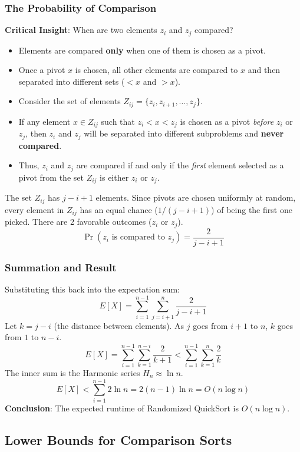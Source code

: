 \documentclass[12pt]{article}
\theoremstyle{blueplain}
\theoremstyle{bluedef}
\theoremstyle{blueremark}
\begin{document}
\subsubsection{The Probability of Comparison}
\textbf{Critical Insight}: When are two elements $z_i$ and $z_j$ compared?
\begin{itemize}
    \item Elements are compared \textbf{only} when one of them is chosen as a pivot.
    \item Once a pivot $x$ is chosen, all other elements are compared to $x$ and then separated into different sets ($<x$ and $>x$).
    \item Consider the set of elements $Z_{ij} = \{z_i, z_{i+1}, \dots, z_j\}$.
    \item If any element $x \in Z_{ij}$ such that $z_i < x < z_j$ is chosen as a pivot \textit{before} $z_i$ or $z_j$, then $z_i$ and $z_j$ will be separated into different subproblems and \textbf{never compared}.
    \item Thus, $z_i$ and $z_j$ are compared if and only if the \textit{first} element selected as a pivot from the set $Z_{ij}$ is either $z_i$ or $z_j$.
\end{itemize}

The set $Z_{ij}$ has $j - i + 1$ elements. Since pivots are chosen uniformly at random, every element in $Z_{ij}$ has an equal chance ($1 / (j-i+1)$) of being the first one picked.
There are 2 favorable outcomes ($z_i$ or $z_j$).
\[ \Pr(z_i \text{ is compared to } z_j) = \frac{2}{j - i + 1} \]

\subsubsection{Summation and Result}
Substituting this back into the expectation sum:
\[ E[X] = \sum_{i=1}^{n-1} \sum_{j=i+1}^{n} \frac{2}{j - i + 1} \]
Let $k = j - i$ (the distance between elements). As $j$ goes from $i+1$ to $n$, $k$ goes from $1$ to $n-i$.
\[ E[X] = \sum_{i=1}^{n-1} \sum_{k=1}^{n-i} \frac{2}{k+1} < \sum_{i=1}^{n-1} \sum_{k=1}^{n} \frac{2}{k} \]
The inner sum is the Harmonic series $H_n \approx \ln n$.
\[ E[X] < \sum_{i=1}^{n-1} 2 \ln n = 2(n-1) \ln n = O(n \log n) \]
\textbf{Conclusion}: The expected runtime of Randomized QuickSort is $O(n \log n)$.

\subsection{Lower Bounds for Comparison Sorts}
\end{document}
